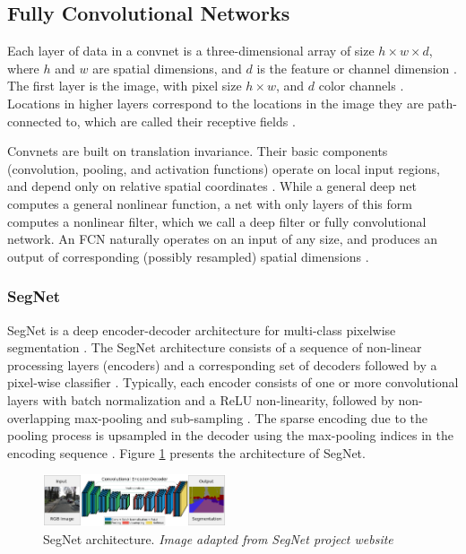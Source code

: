 \documentclass[10pt,twocolumn,letterpaper]{article}
\begin{document}
\subsection{Fully Convolutional Networks} \label{ssec:fully_conv}

Each layer of data in a convnet is a three-dimensional array of size $h \times w \times d$, where $h$ and $w$ are spatial dimensions, and $d$ is the feature or channel dimension \cite{FULLY_CONVOLU}. The first layer is the image, with pixel size $h \times w$, and $d$ color channels \cite{FULLY_CONVOLU}. Locations in higher layers correspond to the locations in the image they are path-connected to, which are called their receptive fields \cite{FULLY_CONVOLU}.

Convnets are built on translation invariance. Their basic components (convolution, pooling, and activation functions) operate on local input regions, and depend only on relative spatial coordinates \cite{FULLY_CONVOLU}. While a general deep net computes a general nonlinear function, a net with only layers of this form computes a
nonlinear filter, which we call a deep filter or fully convolutional network. An FCN naturally operates on an input of any size, and produces an output of corresponding (possibly resampled) spatial dimensions \cite{FULLY_CONVOLU}.

\subsubsection{SegNet} \label{sssec:segnet}

SegNet is a deep encoder-decoder architecture for multi-class pixelwise segmentation \cite{SEGNET}. The SegNet architecture consists of a sequence of non-linear processing layers (encoders) and a corresponding set of decoders followed by a pixel-wise classifier \cite{SEGNET} \cite{SEGNET_WEBSITE}. Typically, each encoder consists of one or more convolutional layers with batch normalization and a ReLU non-linearity, followed by non-overlapping max-pooling and sub-sampling \cite{SEGNET} \cite{SEGNET_WEBSITE}. The sparse encoding due to the pooling process is upsampled in the decoder using the max-pooling indices in the encoding sequence \cite{SEGNET} \cite{SEGNET_WEBSITE}. Figure \ref{fig:segnet} presents the architecture of SegNet.

\begin{figure}[ht]
  \centering
  \includegraphics[width=0.48\textwidth]{segnet.png}
  \caption{SegNet architecture. \textit{Image adapted from SegNet project website} \cite{SEGNET_WEBSITE} \cite{SEGNET}}
  \label{fig:segnet}
\end{figure}
\end{document}
